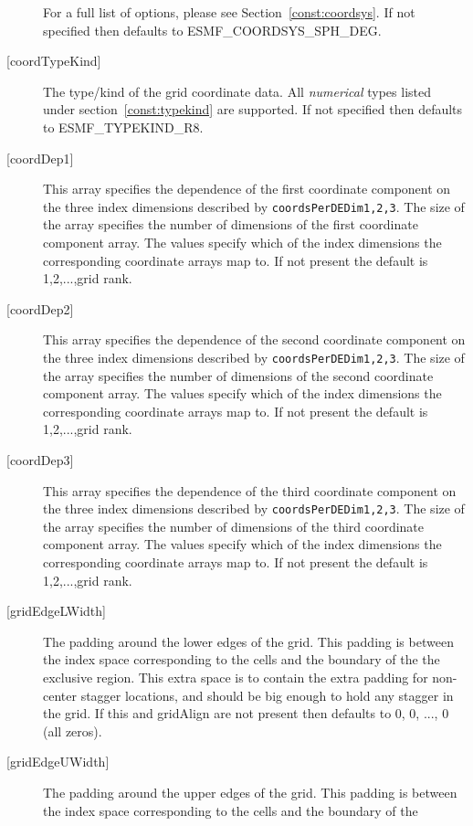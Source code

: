 \begin{description}
       For a full list of options, please see Section~\ref{const:coordsys}.
       If not specified then defaults to ESMF\_COORDSYS\_SPH\_DEG.
   \item[{[coordTypeKind]}]
       The type/kind of the grid coordinate data. All {\em numerical} types
       listed under section~\ref{const:typekind} are supported.
       If not specified then defaults to ESMF\_TYPEKIND\_R8.
   \item[{[coordDep1]}]
       This array specifies the dependence of the first
       coordinate component on the three index dimensions
       described by {\tt coordsPerDEDim1,2,3}. The size of the
       array specifies the number of dimensions of the first
       coordinate component array. The values specify which
       of the index dimensions the corresponding coordinate
       arrays map to. If not present the default is 1,2,...,grid rank.
   \item[{[coordDep2]}]
       This array specifies the dependence of the second
       coordinate component on the three index dimensions
       described by {\tt coordsPerDEDim1,2,3}. The size of the
       array specifies the number of dimensions of the second
       coordinate component array. The values specify which
       of the index dimensions the corresponding coordinate
       arrays map to. If not present the default is 1,2,...,grid rank.
   \item[{[coordDep3]}]
       This array specifies the dependence of the third
       coordinate component on the three index dimensions
       described by {\tt coordsPerDEDim1,2,3}. The size of the
       array specifies the number of dimensions of the third
       coordinate component array. The values specify which
       of the index dimensions the corresponding coordinate
       arrays map to. If not present the default is 1,2,...,grid rank.
   \item[{[gridEdgeLWidth]}]
        The padding around the lower edges of the grid. This padding is between
        the index space corresponding to the cells and the boundary of the
        the exclusive region. This extra space is to contain the extra
        padding for non-center stagger locations, and should be big enough
        to hold any stagger in the grid. If this and gridAlign are not present then
        defaults to 0, 0, ..., 0 (all zeros).
   \item[{[gridEdgeUWidth]}]
        The padding around the upper edges of the grid. This padding is between
        the index space corresponding to the cells and the boundary of the

\end{description}
